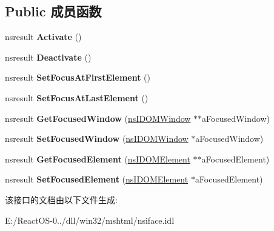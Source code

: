 \subsection*{Public 成员函数}
\begin{DoxyCompactItemize}
\item 
\mbox{\label{interfacens_i_web_browser_focus_a10aee3f4b6679c6860e3ed8bfecb539c}} 
nsresult {\bfseries Activate} ()
\item 
\mbox{\label{interfacens_i_web_browser_focus_a80c60622025df343182df6ca6cfd6ac4}} 
nsresult {\bfseries Deactivate} ()
\item 
\mbox{\label{interfacens_i_web_browser_focus_a677cfa9d41dd5ae66e6ecd8a674efc59}} 
nsresult {\bfseries Set\+Focus\+At\+First\+Element} ()
\item 
\mbox{\label{interfacens_i_web_browser_focus_a66052c1df559d8bb8da52df1c0291f89}} 
nsresult {\bfseries Set\+Focus\+At\+Last\+Element} ()
\item 
\mbox{\label{interfacens_i_web_browser_focus_a5a3778c8804b087c62b72b6f18af59c5}} 
nsresult {\bfseries Get\+Focused\+Window} (\hyperlink{interfacens_i_d_o_m_window}{ns\+I\+D\+O\+M\+Window} $\ast$$\ast$a\+Focused\+Window)
\item 
\mbox{\label{interfacens_i_web_browser_focus_a641bbc6619a5a031b00f93b734d511a2}} 
nsresult {\bfseries Set\+Focused\+Window} (\hyperlink{interfacens_i_d_o_m_window}{ns\+I\+D\+O\+M\+Window} $\ast$a\+Focused\+Window)
\item 
\mbox{\label{interfacens_i_web_browser_focus_a1fab4cd7547c4497667ae7f9d883750c}} 
nsresult {\bfseries Get\+Focused\+Element} (\hyperlink{interfacens_i_d_o_m_element}{ns\+I\+D\+O\+M\+Element} $\ast$$\ast$a\+Focused\+Element)
\item 
\mbox{\label{interfacens_i_web_browser_focus_a6b6ba4ad35e0def474b84b4969bf64e8}} 
nsresult {\bfseries Set\+Focused\+Element} (\hyperlink{interfacens_i_d_o_m_element}{ns\+I\+D\+O\+M\+Element} $\ast$a\+Focused\+Element)
\end{DoxyCompactItemize}


该接口的文档由以下文件生成\+:\begin{DoxyCompactItemize}
\item 
E\+:/\+React\+O\+S-\/0../dll/win32/mshtml/nsiface.\+idl\end{DoxyCompactItemize}
